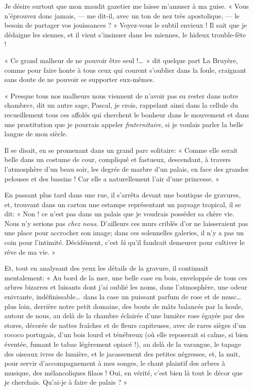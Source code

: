 Je désire surtout que mon maudit gazetier me laisse
m’amuser à ma guise. « Vous
n’éprouvez donc jamais, --- me dit{}-il, avec un ton de
nez très apostolique, --- le besoin de partager vos jouissances ? »
Voyez{}-vous le subtil envieux ! Il sait que je dédaigne les siennes,
et il vient s’insinuer dans les miennes, le hideux
trouble{}-fête !

« Ce grand malheur de ne pouvoir être seul !\ldots\ » dit quelque part La
Bruyère, comme pour faire honte à tous ceux qui courent
s’oublier dans la foule, craignant sans doute de ne
pouvoir se supporter eux{}-mêmes.

« Presque tous nos malheurs nous viennent de n’avoir
pas su rester dans notre chambre», dit un autre sage, Pascal, je crois,
rappelant ainsi dans la cellule du recueillement tous ces affolés qui
cherchent le bonheur dans le mouvement et dans une prostitution que je
pourrais appeler \textit{fraternitaire}, si je voulais parler la belle langue de
mon siècle.


Il se disait, en se promenant dans un grand parc solitaire: « Comme elle
serait belle dans un costume de cour, compliqué et fastueux,
descendant, à travers l’atmosphère
d’un beau soir, les degrés de marbre
d’un palais, en face des grandes pelouses et des
bassins ! Car elle a naturellement l’air
d’une princesse. »

En passant plus tard dans une rue, il s’arrêta devant
une boutique de gravures, et, trouvant dans un carton une estampe
représentant un paysage tropical, il se dit: « Non ! ce
n’est pas dans un palais que je voudrais posséder sa
chère vie. Nous n’y serions pas \textit{chez nous}.
D’ailleurs ces murs criblés d’or ne
laisseraient pas une place pour accrocher son image; dans ces
solennelles galeries, il n’y a pas un coin pour
l’intimité. Décidément, c’est \textit{là}
qu’il faudrait demeurer pour cultiver le rêve de ma
vie. »

Et, tout en analysant des yeux les détails de la gravure, il continuait
mentalement: « Au bord de la mer, une belle case en bois, enveloppée de
tous ces arbres bizarres et luisants dont j’ai oublié
les noms, dans l’atmosphère, une odeur enivrante,
indéfinissable\ldots\ dans la case un puissant parfum de rose et de musc\ldots
plus loin, derrière notre petit domaine, des bouts de mâts balancés par
la houle, autour de nous, au delà de la chambre éclairée
d’une lumière rose égayée par des stores, décorée de
nattes fraîches et de fleurs capiteuses, avec de rares sièges
d’un rococo portugais, d’un bois
lourd et ténébreux (où elle reposerait si calme, si bien éventée,
fumant le tabac légèrement opiacé !), au delà de la varangue, le tapage
des oiseaux ivres de lumière, et le jacassement des petites négresses,
et, la nuit, pour servir d’accompagnement à mes
songes, le chant plaintif des arbres à musique, des mélancoliques
filaos ! Oui, en vérité, c’est bien là tout le décor
que je cherchais. Qu’ai{}-je à faire de palais ? »


